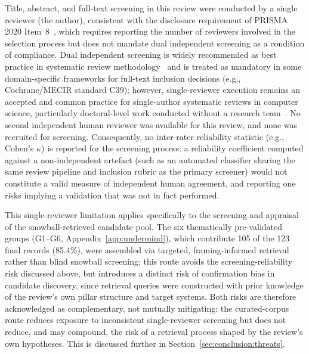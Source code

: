 Title, abstract, and full-text screening in this review were conducted by
a single reviewer (the author), consistent with the disclosure requirement
of PRISMA 2020 Item~8~\cite{Page2021}, which requires reporting the number
of reviewers involved in the selection process but does not mandate dual
independent screening as a condition of compliance. Dual independent
screening is widely recommended as best practice in systematic review
methodology~\cite{KitchenhamCharters2007} and is treated as mandatory in
some domain-specific frameworks for full-text inclusion decisions (e.g.,
Cochrane/MECIR standard C39); however, single-reviewer execution remains
an accepted and common practice for single-author systematic reviews in
computer science, particularly doctoral-level work conducted without a
research team~\cite{KitchenhamCharters2007}. No second independent human
reviewer was available for this review, and none was recruited for
screening. Consequently, no inter-rater reliability statistic (e.g.,
Cohen's $\kappa$) is reported for the screening process: a reliability
coefficient computed against a non-independent artefact (such as an
automated classifier sharing the same review pipeline and inclusion
rubric as the primary screener) would not constitute a valid measure of
independent human agreement, and reporting one risks implying a
validation that was not in fact performed.


This single-reviewer limitation applies specifically to the screening and
appraisal of the snowball-retrieved candidate pool. The six thematically
pre-validated groups (G1--G6, Appendix~\ref{app:undermind}), which
contribute 105 of the 123 final records (85.4\%), were assembled via targeted,
framing-informed retrieval rather than blind snowball screening; this
route avoids the screening-reliability risk discussed above, but
introduces a distinct risk of confirmation bias in candidate discovery,
since retrieval queries were constructed with prior knowledge of the
review's own pillar structure and target systems. Both risks are
therefore acknowledged as complementary, not mutually mitigating: the
curated-corpus route reduces exposure to inconsistent single-reviewer
screening but does not reduce, and may compound, the risk of a
retrieval process shaped by the review's own hypotheses. This is
discussed further in Section~\ref{sec:conclusion:threats}.

